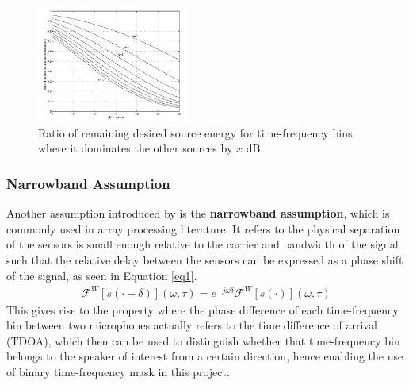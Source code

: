 \documentclass[a4paper,twoside,12pt,hidelinks]{article}
\begin{document}
\begin{figure}[H]
\begin{center}
\includegraphics[width=0.45\textwidth]{wortho}
\end{center}
\caption{Ratio of remaining desired source energy for time-frequency bins where it dominates the other sources by $x$ dB \cite{RickardOnSpeech}}
\label{fig:wortho}
\end{figure}

\subsubsection{Narrowband Assumption}
Another assumption introduced by \cite{JourjineBlindMixtures} is the \textbf{narrowband assumption}, which is commonly used in array processing literature. It refers to the physical separation of the sensors is small enough relative to the carrier and bandwidth of the signal such that the relative delay between the sensors can be expressed as a phase shift of the signal, as seen in Equation \eqref{eq1}. 
\begin{align}
\mathcal{F}^W[s(\cdot-\delta)](\omega,\tau) = e^{-j\omega\delta}\mathcal{F}^W[s(\cdot)](\omega,\tau) \label{eq1}
\end{align}
This gives rise to the property where the phase difference of each time-frequency bin between two microphones actually refers to the time difference of arrival (TDOA), which then can be used to distinguish whether that time-frequency bin belongs to the speaker of interest from a certain direction, hence enabling the use of binary time-frequency mask in this project.
\end{document}
